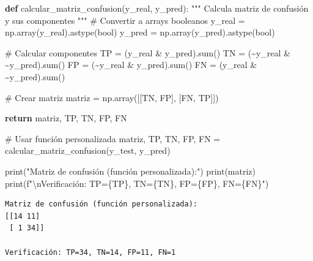 \documentclass[
  doc,
  floatsintext,
  longtable,
  a4paper,
  nolmodern,
  notxfonts,
  notimes,
  12pt,
  colorlinks=true,linkcolor=blue,citecolor=blue,urlcolor=blue]{apa7}
\newenvironment{Shaded}{\begin{snugshade}}{\end{snugshade}}
\newcommand{\BuiltInTok}[1]{\textcolor[rgb]{0.00,0.23,0.31}{#1}}
\newcommand{\CharTok}[1]{\textcolor[rgb]{0.13,0.47,0.30}{#1}}
\newcommand{\CommentTok}[1]{\textcolor[rgb]{0.37,0.37,0.37}{#1}}
\newcommand{\ControlFlowTok}[1]{\textcolor[rgb]{0.00,0.23,0.31}{\textbf{#1}}}
\newcommand{\KeywordTok}[1]{\textcolor[rgb]{0.00,0.23,0.31}{\textbf{#1}}}
\newcommand{\NormalTok}[1]{\textcolor[rgb]{0.00,0.23,0.31}{#1}}
\newcommand{\OperatorTok}[1]{\textcolor[rgb]{0.37,0.37,0.37}{#1}}
\newcommand{\SpecialCharTok}[1]{\textcolor[rgb]{0.37,0.37,0.37}{#1}}
\newcommand{\SpecialStringTok}[1]{\textcolor[rgb]{0.13,0.47,0.30}{#1}}
\newcommand{\StringTok}[1]{\textcolor[rgb]{0.13,0.47,0.30}{#1}}
\begin{document}
\begin{Shaded}
\begin{Highlighting}[]
\KeywordTok{def}\NormalTok{ calcular\_matriz\_confusion(y\_real, y\_pred):}
    \CommentTok{"""}
\CommentTok{    Calcula matriz de confusión y sus componentes}
\CommentTok{    """}
    \CommentTok{\# Convertir a arrays booleanos}
\NormalTok{    y\_real }\OperatorTok{=}\NormalTok{ np.array(y\_real).astype(}\BuiltInTok{bool}\NormalTok{)}
\NormalTok{    y\_pred }\OperatorTok{=}\NormalTok{ np.array(y\_pred).astype(}\BuiltInTok{bool}\NormalTok{)}
    
    \CommentTok{\# Calcular componentes}
\NormalTok{    TP }\OperatorTok{=}\NormalTok{ (y\_real }\OperatorTok{\&}\NormalTok{ y\_pred).}\BuiltInTok{sum}\NormalTok{()}
\NormalTok{    TN }\OperatorTok{=}\NormalTok{ (}\OperatorTok{\textasciitilde{}}\NormalTok{y\_real }\OperatorTok{\&} \OperatorTok{\textasciitilde{}}\NormalTok{y\_pred).}\BuiltInTok{sum}\NormalTok{()}
\NormalTok{    FP }\OperatorTok{=}\NormalTok{ (}\OperatorTok{\textasciitilde{}}\NormalTok{y\_real }\OperatorTok{\&}\NormalTok{ y\_pred).}\BuiltInTok{sum}\NormalTok{()}
\NormalTok{    FN }\OperatorTok{=}\NormalTok{ (y\_real }\OperatorTok{\&} \OperatorTok{\textasciitilde{}}\NormalTok{y\_pred).}\BuiltInTok{sum}\NormalTok{()}
    
    \CommentTok{\# Crear matriz}
\NormalTok{    matriz }\OperatorTok{=}\NormalTok{ np.array([[TN, FP],}
\NormalTok{                       [FN, TP]])}
    
    \ControlFlowTok{return}\NormalTok{ matriz, TP, TN, FP, FN}

\CommentTok{\# Usar función personalizada}
\NormalTok{matriz, TP, TN, FP, FN }\OperatorTok{=}\NormalTok{ calcular\_matriz\_confusion(y\_test, y\_pred)}

\BuiltInTok{print}\NormalTok{(}\StringTok{"Matriz de confusión (función personalizada):"}\NormalTok{)}
\BuiltInTok{print}\NormalTok{(matriz)}
\BuiltInTok{print}\NormalTok{(}\SpecialStringTok{f"}\CharTok{\textbackslash{}n}\SpecialStringTok{Verificación: TP=}\SpecialCharTok{\{}\NormalTok{TP}\SpecialCharTok{\}}\SpecialStringTok{, TN=}\SpecialCharTok{\{}\NormalTok{TN}\SpecialCharTok{\}}\SpecialStringTok{, FP=}\SpecialCharTok{\{}\NormalTok{FP}\SpecialCharTok{\}}\SpecialStringTok{, FN=}\SpecialCharTok{\{}\NormalTok{FN}\SpecialCharTok{\}}\SpecialStringTok{"}\NormalTok{)}
\end{Highlighting}
\end{Shaded}

\begin{verbatim}
Matriz de confusión (función personalizada):
[[14 11]
 [ 1 34]]

Verificación: TP=34, TN=14, FP=11, FN=1
\end{verbatim}
\end{document}
